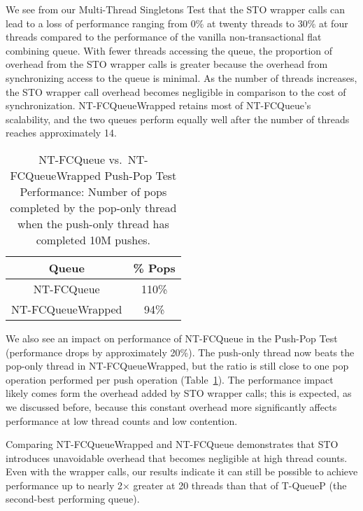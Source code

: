 We see from our Multi-Thread Singletons Test that the STO wrapper calls can lead to a loss of performance ranging from 0\% at twenty threads to 30\% at four threads compared to the performance of the vanilla non-transactional flat combining queue. 
 With fewer threads accessing the queue, the proportion of overhead from the STO wrapper calls is greater because the overhead from synchronizing access to the queue is minimal. As the number of threads increases, the STO wrapper call overhead becomes negligible in comparison to the cost of synchronization.
NT-FCQueueWrapped retains most of NT-FCQueue's scalability, and the two queues perform equally well after the number of threads reaches approximately 14.

\begin{table}[t]
        \centering
    \begin{tabular}{|cc|}
        \hline
        Queue & \% Pops\\
        \hline
            NT-FCQueue & 110\%\\
            NT-FCQueueWrapped & 94\%\\
        \hline
    \end{tabular}
    \caption{NT-FCQueue vs.\ NT-FCQueueWrapped Push-Pop Test Performance: Number of pops completed by the pop-only thread when the push-only thread has completed 10M pushes.}
    \label{tab:nt_pop_push_ratio}
\end{table}

We also see an impact on performance of NT-FCQueue in the Push-Pop Test (performance drops by approximately 20\%). The push-only thread now beats the pop-only thread in NT-FCQueueWrapped, but the ratio is still close to one pop operation performed per push operation (Table~\ref{tab:nt_pop_push_ratio}). The performance impact likely comes form the overhead added by STO wrapper calls; this is expected, as we discussed before, because this constant overhead more significantly affects performance at low thread counts and low contention.

Comparing NT-FCQueueWrapped and NT-FCQueue demonstrates that STO introduces unavoidable overhead that becomes negligible at high thread counts. Even with the wrapper calls, our results indicate it can still be possible to achieve performance up to nearly 2$\times$ greater at 20 threads than that of T-QueueP (the second-best performing queue).

\vspace{12pt}
\noindent{}

